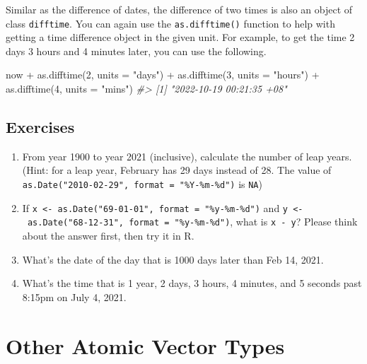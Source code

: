 \documentclass[
]{book}
\newenvironment{Shaded}{\begin{snugshade}}{\end{snugshade}}
\newcommand{\AttributeTok}[1]{\textcolor[rgb]{0.77,0.63,0.00}{#1}}
\newcommand{\CommentTok}[1]{\textcolor[rgb]{0.56,0.35,0.01}{\textit{#1}}}
\newcommand{\DecValTok}[1]{\textcolor[rgb]{0.00,0.00,0.81}{#1}}
\newcommand{\FunctionTok}[1]{\textcolor[rgb]{0.00,0.00,0.00}{#1}}
\newcommand{\NormalTok}[1]{#1}
\newcommand{\SpecialCharTok}[1]{\textcolor[rgb]{0.00,0.00,0.00}{#1}}
\newcommand{\StringTok}[1]{\textcolor[rgb]{0.31,0.60,0.02}{#1}}
\begin{document}
Similar as the difference of dates, the difference of two times is also an object of class \texttt{difftime}. You can again use the \texttt{as.difftime()} function to help with getting a time difference object in the given unit. For example, to get the time 2 days 3 hours and 4 minutes later, you can use the following.

\begin{Shaded}
\begin{Highlighting}[]
\NormalTok{now }\SpecialCharTok{+} \FunctionTok{as.difftime}\NormalTok{(}\DecValTok{2}\NormalTok{, }\AttributeTok{units =} \StringTok{"days"}\NormalTok{) }\SpecialCharTok{+} \FunctionTok{as.difftime}\NormalTok{(}\DecValTok{3}\NormalTok{, }\AttributeTok{units =} \StringTok{"hours"}\NormalTok{) }\SpecialCharTok{+} \FunctionTok{as.difftime}\NormalTok{(}\DecValTok{4}\NormalTok{, }\AttributeTok{units =} \StringTok{"mins"}\NormalTok{) }
\CommentTok{\#\textgreater{} [1] "2022{-}10{-}19 00:21:35 +08"}
\end{Highlighting}
\end{Shaded}

\hypertarget{exercises-18}{%
\subsection{Exercises}\label{exercises-18}}

\begin{enumerate}
\def\labelenumi{\arabic{enumi}.}
\item
  From year 1900 to year 2021 (inclusive), calculate the number of leap years. (Hint: for a leap year, February has 29 days instead of 28. The value of \texttt{as.Date("2010-02-29",\ format\ =\ "\%Y-\%m-\%d")} is \texttt{NA})
\item
  If \texttt{x\ \textless{}-\ as.Date("69-01-01",\ format\ =\ "\%y-\%m-\%d")} and \texttt{y\ \textless{}-\ as.Date("68-12-31",\ format\ =\ "\%y-\%m-\%d")}, what is \texttt{x\ -\ y}? Please think about the answer first, then try it in R.
\item
  What's the date of the day that is 1000 days later than Feb 14, 2021.
\item
  What's the time that is 1 year, 2 days, 3 hours, 4 minutes, and 5 seconds past 8:15pm on July 4, 2021.
\end{enumerate}

\hypertarget{other-atomic-vector}{%
\section{Other Atomic Vector Types}\label{other-atomic-vector}}
\end{document}
